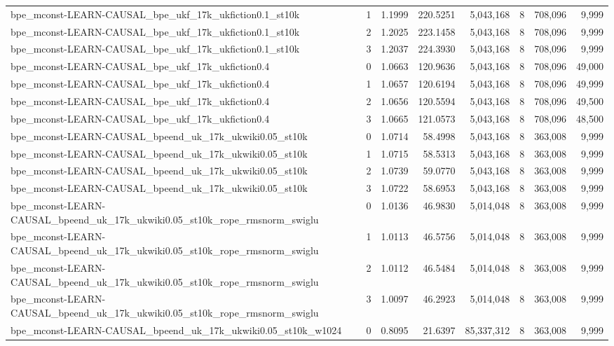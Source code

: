 \begin{tabular}{lrrrrrrr}
bpe\_mconst-LEARN-CAUSAL\_bpe\_ukf\_17k\_ukfiction0.1\_st10k & 1 & 1.1999 & 220.5251 & 5,043,168 & 8 & 708,096 & 9,999 \\
bpe\_mconst-LEARN-CAUSAL\_bpe\_ukf\_17k\_ukfiction0.1\_st10k & 2 & 1.2025 & 223.1458 & 5,043,168 & 8 & 708,096 & 9,999 \\
bpe\_mconst-LEARN-CAUSAL\_bpe\_ukf\_17k\_ukfiction0.1\_st10k & 3 & 1.2037 & 224.3930 & 5,043,168 & 8 & 708,096 & 9,999 \\
bpe\_mconst-LEARN-CAUSAL\_bpe\_ukf\_17k\_ukfiction0.4 & 0 & 1.0663 & 120.9636 & 5,043,168 & 8 & 708,096 & 49,000 \\
bpe\_mconst-LEARN-CAUSAL\_bpe\_ukf\_17k\_ukfiction0.4 & 1 & 1.0657 & 120.6194 & 5,043,168 & 8 & 708,096 & 49,999 \\
bpe\_mconst-LEARN-CAUSAL\_bpe\_ukf\_17k\_ukfiction0.4 & 2 & 1.0656 & 120.5594 & 5,043,168 & 8 & 708,096 & 49,500 \\
bpe\_mconst-LEARN-CAUSAL\_bpe\_ukf\_17k\_ukfiction0.4 & 3 & 1.0665 & 121.0573 & 5,043,168 & 8 & 708,096 & 48,500 \\
bpe\_mconst-LEARN-CAUSAL\_bpeend\_uk\_17k\_ukwiki0.05\_st10k & 0 & 1.0714 & 58.4998 & 5,043,168 & 8 & 363,008 & 9,999 \\
bpe\_mconst-LEARN-CAUSAL\_bpeend\_uk\_17k\_ukwiki0.05\_st10k & 1 & 1.0715 & 58.5313 & 5,043,168 & 8 & 363,008 & 9,999 \\
bpe\_mconst-LEARN-CAUSAL\_bpeend\_uk\_17k\_ukwiki0.05\_st10k & 2 & 1.0739 & 59.0770 & 5,043,168 & 8 & 363,008 & 9,999 \\
bpe\_mconst-LEARN-CAUSAL\_bpeend\_uk\_17k\_ukwiki0.05\_st10k & 3 & 1.0722 & 58.6953 & 5,043,168 & 8 & 363,008 & 9,999 \\
bpe\_mconst-LEARN-CAUSAL\_bpeend\_uk\_17k\_ukwiki0.05\_st10k\_rope\_rmsnorm\_swiglu & 0 & 1.0136 & 46.9830 & 5,014,048 & 8 & 363,008 & 9,999 \\
bpe\_mconst-LEARN-CAUSAL\_bpeend\_uk\_17k\_ukwiki0.05\_st10k\_rope\_rmsnorm\_swiglu & 1 & 1.0113 & 46.5756 & 5,014,048 & 8 & 363,008 & 9,999 \\
bpe\_mconst-LEARN-CAUSAL\_bpeend\_uk\_17k\_ukwiki0.05\_st10k\_rope\_rmsnorm\_swiglu & 2 & 1.0112 & 46.5484 & 5,014,048 & 8 & 363,008 & 9,999 \\
bpe\_mconst-LEARN-CAUSAL\_bpeend\_uk\_17k\_ukwiki0.05\_st10k\_rope\_rmsnorm\_swiglu & 3 & 1.0097 & 46.2923 & 5,014,048 & 8 & 363,008 & 9,999 \\
bpe\_mconst-LEARN-CAUSAL\_bpeend\_uk\_17k\_ukwiki0.05\_st10k\_w1024 & 0 & 0.8095 & 21.6397 & 85,337,312 & 8 & 363,008 & 9,999 \\

\end{tabular}
